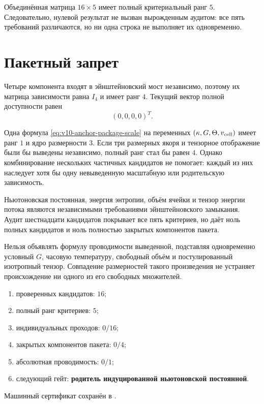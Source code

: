 Объединённая матрица $16\times5$ имеет полный критериальный ранг $5$.
Следовательно, нулевой результат не вызван вырожденным аудитом: все пять
требований различаются, но ни одна строка не выполняет их одновременно.

\section{Пакетный запрет}

Четыре компонента входят в эйнштейновский мост независимо, поэтому их
матрица зависимости равна $I_4$ и имеет ранг $4$. Текущий вектор полной
доступности равен
\begin{equation}
 (0,0,0,0)^T.
 \label{eq:v10-anchor-package-zero-vector}
\end{equation}

Одна формула \eqref{eq:v10-anchor-package-scale} на переменных
$(\kappa,G,\Theta,v_{\rm cell})$ имеет ранг $1$ и ядро размерности $3$.
Если три размерных якоря и тензорное отображение были бы выведены
независимо, полный ранг стал бы равен $4$. Однако комбинирование нескольких
частичных кандидатов не помогает: каждый из них наследует хотя бы одну
невыведенную масштабную или родительскую зависимость.

\begin{theorem}
Ньютоновская постоянная, энергия энтропии, объём ячейки и тензор энергии
потока являются независимыми требованиями эйнштейновского замыкания. Аудит
шестнадцати кандидатов покрывает все пять критериев, но даёт ноль полных
кандидатов и ноль полностью закрытых компонентов пакета.
\end{theorem}

\begin{nogocriterion}
Нельзя объявлять формулу проводимости выведенной, подставляя одновременно
условный $G$, часовую температуру, свободный объём и постулированный
изотропный тензор. Совпадение размерностей такого произведения не устраняет
происхождение ни одного из его свободных множителей.
\end{nogocriterion}

\begin{protocol}\begin{enumerate}
\item проверенных кандидатов: \textbf{$16$};
\item полный ранг критериев: \textbf{$5$};
\item индивидуальных проходов: \textbf{$0/16$};
\item закрытых компонентов пакета: \textbf{$0/4$};
\item абсолютная проводимость: \textbf{$0/1$};
\item следующий гейт: \textbf{родитель индуцированной ньютоновской
постоянной}.
\end{enumerate}\end{protocol}

Машинный сертификат сохранён в
.
